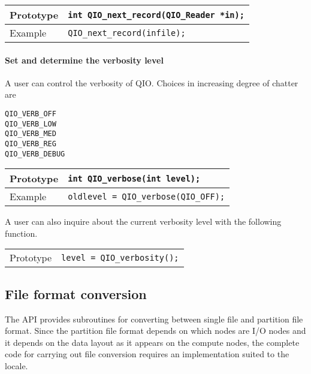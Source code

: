 \documentclass{article}
\begin{document}
\begin{flushleft}
  \begin{tabular}{|l|l|}
  \hline
  Prototype      & \verb|int QIO_next_record(QIO_Reader *in);| \\
\hline
  Example  & \verb|QIO_next_record(infile);|\\
   \hline
 \end{tabular}
\end{flushleft}
%

\paragraph{Set and determine the verbosity level}

A user can control the verbosity of QIO\@.  Choices in increasing
degree of chatter are
%
\begin{verbatim}
QIO_VERB_OFF   
QIO_VERB_LOW   
QIO_VERB_MED   
QIO_VERB_REG   
QIO_VERB_DEBUG 
\end{verbatim}
%
\begin{flushleft}
  \begin{tabular}{|l|l|}
  \hline
  Prototype      & \verb|int QIO_verbose(int level);| \\
\hline
  Example  & \verb|oldlevel = QIO_verbose(QIO_OFF);|\\
   \hline
 \end{tabular}
\end{flushleft}
%

A user can also inquire about the current verbosity level with the
following function.

%
\begin{flushleft}
  \begin{tabular}{|l|l|}
  \hline
  Prototype      & \verb|level = QIO_verbosity();| \\
 \end{tabular}
\end{flushleft}
%


\subsection{File format conversion}

The API provides subroutines for converting between single file and
partition file format.  Since the partition file format depends on
which nodes are I/O nodes and it depends on the data layout as it
appears on the compute nodes, the complete code for carrying out file
conversion requires an implementation suited to the locale.
\end{document}
